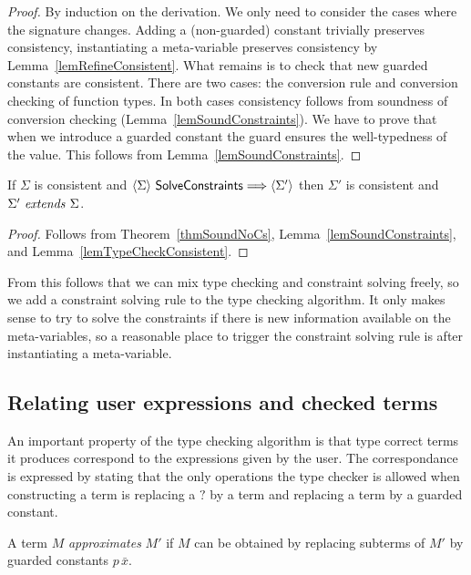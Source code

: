 \begin{proof}
\if {}
    By induction on the derivation. We only need to consider the cases where
    the signature changes. Adding a (non-guarded) constant trivially preserves
    consistency, instantiating a meta-variable preserves consistency by
    Lemma~\ref{lemRefineConsistent}. What remains is to check that new guarded
    constants are consistent. There are two cases: the conversion rule and
    conversion checking of function types. In both cases consistency follows
    from soundness of conversion checking (Lemma~\ref{lemSoundConstraints}).
\else
    We have to prove that when we introduce a guarded constant the guard
    ensures the well-typedness of the value. This follows from
    Lemma~\ref{lemSoundConstraints}.
\fi
\end{proof}

\begin{lemma} \label{lemSolveConsistent}
    If $\Sigma$ is consistent and $\langle {\Sigma} \rangle ~ {\mathsf{SolveConstraints}} \Longrightarrow \langle {\Sigma'} \rangle$ then $\Sigma'$ is consistent and ${\Sigma'} ~ \mathit{extends} ~ {\Sigma}$.
\end{lemma}

\begin{proof}
    Follows from Theorem~\ref{thmSoundNoCs}, Lemma~\ref{lemSoundConstraints},
    and Lemma~\ref{lemTypeCheckConsistent}.
\end{proof}

From this follows that we can mix type checking and constraint solving freely,
so we add a constraint solving rule to the type checking algorithm. It only
makes sense to try to solve the constraints if there is new information
available on the meta-variables, so a reasonable place to trigger the
constraint solving rule is after instantiating a meta-variable.

\subsection{Relating user expressions and checked terms}

An important property of the type checking algorithm is that type correct terms
it produces correspond to the expressions given by the user. The correspondance
is expressed by stating that the only operations the type checker is allowed
when constructing a term is replacing a $?$ by a term and replacing a term by a
guarded constant.

\begin{definition}[Approximation]
    A term $M$ {\em approximates} $M'$ if $M$ can be obtained by replacing
    subterms of $M'$ by guarded constants $p \, \bar x$.
\end{definition}

